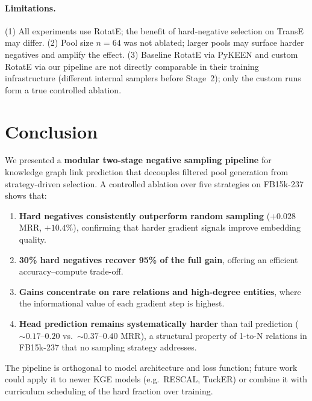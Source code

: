 \documentclass[10pt,twocolumn,letterpaper]{article}
\begin{document}
\paragraph{Limitations.}
(1) All experiments use RotatE; the benefit of hard-negative selection on
TransE may differ.
(2) Pool size $n=64$ was not ablated; larger pools may surface harder
negatives and amplify the effect.
(3) Baseline RotatE via PyKEEN and custom RotatE via our pipeline are not
directly comparable in their training infrastructure (different internal
samplers before Stage~2); only the custom runs form a true controlled ablation.

\section{Conclusion}
\label{sec:conclusion}

We presented a \textbf{modular two-stage negative sampling pipeline} for
knowledge graph link prediction that decouples filtered pool generation
from strategy-driven selection. A controlled ablation over five strategies
on FB15k-237 shows that:

\begin{enumerate}
  \item \textbf{Hard negatives consistently outperform random sampling}
    ($+0.028$ MRR, $+10.4\%$), confirming that harder gradient signals
    improve embedding quality.
  \item \textbf{30\% hard negatives recover 95\% of the full gain},
    offering an efficient accuracy--compute trade-off.
  \item \textbf{Gains concentrate on rare relations and high-degree entities},
    where the informational value of each gradient step is highest.
  \item \textbf{Head prediction remains systematically harder} than tail
    prediction ($\sim\!0.17$--$0.20$ vs.\ $\sim\!0.37$--$0.40$ MRR),
    a structural property of 1-to-N relations in FB15k-237 that no
    sampling strategy addresses.
\end{enumerate}

The pipeline is orthogonal to model architecture and loss function; future
work could apply it to newer KGE models (e.g.\ RESCAL, TuckER) or combine
it with curriculum scheduling of the hard fraction over training.

\end{document}
